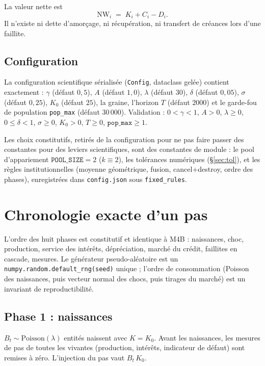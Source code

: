 \documentclass[11pt,a4paper]{article}
\newcommand{\code}[1]{\texttt{#1}}
\newcommand{\NW}{\mathrm{NW}}
\begin{document}
La valeur nette est
\begin{equation}
\NW_i \;=\; K_i + C_i - D_i .
\label{eq:nw}
\end{equation}
Il n'existe ni dette d'amorçage, ni récupération, ni transfert de créances
lors d'une faillite.

\subsection{Configuration}

La configuration scientifique sérialisée (\code{Config}, dataclass gelée)
contient exactement : $\gamma$ (défaut $0{,}5$), $A$ (défaut $1{,}0$),
$\lambda$ (défaut $30$), $\delta$ (défaut $0{,}05$), $\sigma$ (défaut
$0{,}25$), $K_0$ (défaut $25$), la graine, l'horizon $T$ (défaut $2000$) et
le garde-fou de population \code{pop\_max} (défaut $30\,000$). Validation :
$0<\gamma<1$, $A>0$, $\lambda\ge0$, $0\le\delta<1$, $\sigma\ge0$, $K_0>0$,
$T\ge0$, $\code{pop\_max}\ge1$.

Les choix constitutifs, retirés de la configuration pour ne pas faire
passer des constantes pour des leviers scientifiques, sont des constantes
de module : le pool d'appariement $\code{POOL\_SIZE}=2$ ($k\equiv2$), les
tolérances numériques (§\ref{sec:tol}), et les règles institutionnelles
(moyenne géométrique, fusion, cancel+destroy, ordre des phases),
enregistrées dans \code{config.json} sous \code{fixed\_rules}.

\section{Chronologie exacte d'un pas}

L'ordre des huit phases est constitutif et identique à M4B :
naissances, choc, production, service des intérêts, dépréciation, marché du
crédit, faillites en cascade, mesures. Le générateur pseudo-aléatoire est
un \code{numpy.random.default\_rng(seed)} unique ; l'ordre de consommation
(Poisson des naissances, puis vecteur normal des chocs, puis tirages du
marché) est un invariant de reproductibilité.

\subsection{Phase 1 : naissances}

$B_t \sim \mathrm{Poisson}(\lambda)$ entités naissent avec $K=K_0$.
Avant les naissances, les mesures de pas de toutes les vivantes
(production, intérêts, indicateur de défaut) sont remises à zéro.
L'injection du pas vaut $B_t\,K_0$.
\end{document}

